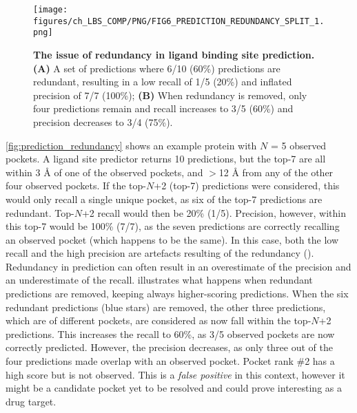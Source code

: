 \begin{figure}[htb!]
    \centering
    \texttt{[image: figures/ch\_LBS\_COMP/PNG/FIG6\_PREDICTION\_REDUNDANCY\_SPLIT\_1.png]}
    \caption[The issue of redundancy in ligand binding site prediction]{\textbf{The issue of redundancy in ligand binding site prediction.} \textbf{(A)} A set of predictions where 6/10 (60\%) predictions are redundant, resulting in a low recall of 1/5 (20\%) and inflated precision of 7/7 (100\%); \textbf{(B)} When redundancy is removed, only four predictions remain and recall increases to 3/5 (60\%) and precision decreases to 3/4 (75\%).}
    \label{fig:prediction_redundancy}
\end{figure}

\FloatBarrier

\autoref{fig:prediction_redundancy} shows an example protein with $N$ = 5 observed pockets. A ligand site predictor returns 10 predictions, but the top-7 are all within 3 \AA{} of one of the observed pockets, and $>$12 \AA{} from any of the other four observed pockets. If the top-$N$+2 (top-7) predictions were considered, this would only recall a single unique pocket, as six of the top-7 predictions are redundant. Top-$N$+2 recall would then be 20\% (1/5). Precision, however, within this top-7 would be 100\% (7/7), as the seven predictions are correctly recalling an observed pocket (which happens to be the same). In this case, both the low recall and the high precision are artefacts resulting of the redundancy (). Redundancy in prediction can often result in an overestimate of the precision and an underestimate of the recall.  illustrates what happens when redundant predictions are removed, keeping always higher-scoring predictions. When the six redundant predictions (blue stars) are removed, the other three predictions, which are of different pockets, are considered as now fall within the top-$N$+2 predictions. This increases the recall to 60\%, as 3/5 observed pockets are now correctly predicted. However, the precision decreases, as only three out of the four predictions made overlap with an observed pocket. Pocket rank \#2 has a high score but is not observed. This is a \textit{false positive} in this context, however it might be a candidate pocket yet to be resolved and could prove interesting as a drug target.

